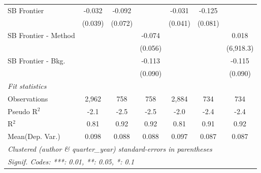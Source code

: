 \begin{tabular}{lcccccc}
   SB Frontier          & -0.032  & -0.092  &              & -0.031       & -0.125  &   \\   
                        & (0.039) & (0.072) &              & (0.041)      & (0.081) &   \\   
   SB Frontier - Method &         &         & -0.074       &              &         & 0.018\\   
                        &         &         & (0.056)      &              &         & (6,918.3)\\   
   SB Frontier - Bkg.   &         &         & -0.113       &              &         & -0.115\\   
                        &         &         & (0.090)      &              &         & (0.090)\\   
   \midrule
   \emph{Fit statistics}\\
   Observations         & 2,962   & 758     & 758          & 2,884        & 734     & 734\\  
   Pseudo R$^2$         & -2.1    & -2.5    & -2.5         & -2.0         & -2.4    & -2.4\\  
   R$^2$                & 0.81    & 0.92    & 0.92         & 0.81         & 0.91    & 0.92\\  
Mean(Dep. Var.) & 0.098 & 0.088 & 0.088 & 0.097 & 0.087 & 0.087 \\
   \midrule \midrule
   \multicolumn{7}{l}{\emph{Clustered (author \& quarter\_year) standard-errors in parentheses}}\\
   \multicolumn{7}{l}{\emph{Signif. Codes: ***: 0.01, **: 0.05, *: 0.1}}\\
\end{tabular}
\par\endgroup
